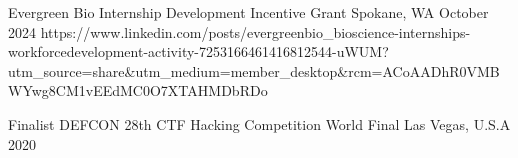 




\begin{cvhonors}

  \cvhonor
    {} %
    { Evergreen Bio Internship Development Incentive Grant } %
    {Spokane, WA} %
    {October 2024} %
    {https://www.linkedin.com/posts/evergreenbio_bioscience-internships-workforcedevelopment-activity-7253166461416812544-uWUM?utm_source=share&utm_medium=member_desktop&rcm=ACoAADhR0VMBWYwg8CM1vEEdMC0O7XTAHMDbRDo}

  \cvhonor
    {Finalist} %
    {DEFCON 28th CTF Hacking Competition World Final} %
    {Las Vegas, U.S.A} %
    {2020} %


\end{cvhonors}




